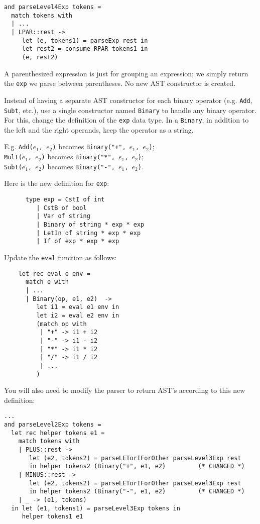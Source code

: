 \documentclass[addpoints]{exam}
\begin{document}
\begin{questions}
\begin{solution}
    \begin{verbatim}
and parseLevel4Exp tokens =
  match tokens with
  | ...
  | LPAR::rest ->
     let (e, tokens1) = parseExp rest in
     let rest2 = consume RPAR tokens1 in
     (e, rest2)
    \end{verbatim}

    A parenthesized expression is just for grouping an expression;
    we simply return the \texttt{exp} we parse between parentheses.
    No new AST constructor is created.
  \end{solution}
  
  \question
  Instead of having a separate AST constructor for
  each binary operator
  (e.g. \texttt{Add}, \texttt{Subt}, etc.),
  use a single constructor named \texttt{Binary}
  to handle any binary operator.
  For this, change the definition of the
  \texttt{exp} data type.
  In a \texttt{Binary},
  in addition to the left and the right operands,
  keep the operator as a string.
  
  E.g. \texttt{Add($e_1$, $e_2$)} becomes
  \texttt{Binary("+", $e_1$, $e_2$)};\\
  \texttt{Mult($e_1$, $e_2$)} becomes
  \texttt{Binary("*", $e_1$, $e_2$)};\\
  \texttt{Subt($e_1$, $e_2$)} becomes
  \texttt{Binary("-", $e_1$, $e_2$)}.
  
  \begin{solution}
    Here is the new definition for \texttt{exp}:
    \begin{verbatim}
      type exp = CstI of int
         | CstB of bool
         | Var of string
         | Binary of string * exp * exp
         | LetIn of string * exp * exp
         | If of exp * exp * exp
    \end{verbatim}

    Update the \texttt{eval} function as follows:

    \begin{verbatim}
    let rec eval e env =
      match e with
      | ...
      | Binary(op, e1, e2)  ->
         let i1 = eval e1 env in
         let i2 = eval e2 env in
         (match op with
          | "+" -> i1 + i2
          | "-" -> i1 - i2
          | "*" -> i1 * i2
          | "/" -> i1 / i2
          | ...
         )
    \end{verbatim}

    You will also need to modify the parser
    to return AST's according to this new definition:

    {\small
    \begin{verbatim}
...
and parseLevel2Exp tokens =
  let rec helper tokens e1 =
    match tokens with
    | PLUS::rest ->
       let (e2, tokens2) = parseLETorIForOther parseLevel3Exp rest
       in helper tokens2 (Binary("+", e1, e2)         (* CHANGED *)
    | MINUS::rest ->
       let (e2, tokens2) = parseLETorIForOther parseLevel3Exp rest
       in helper tokens2 (Binary("-", e1, e2)         (* CHANGED *)
    | _ -> (e1, tokens)
  in let (e1, tokens1) = parseLevel3Exp tokens in
     helper tokens1 e1


\end{verbatim}}
\end{solution}
\end{questions}
\end{document}
